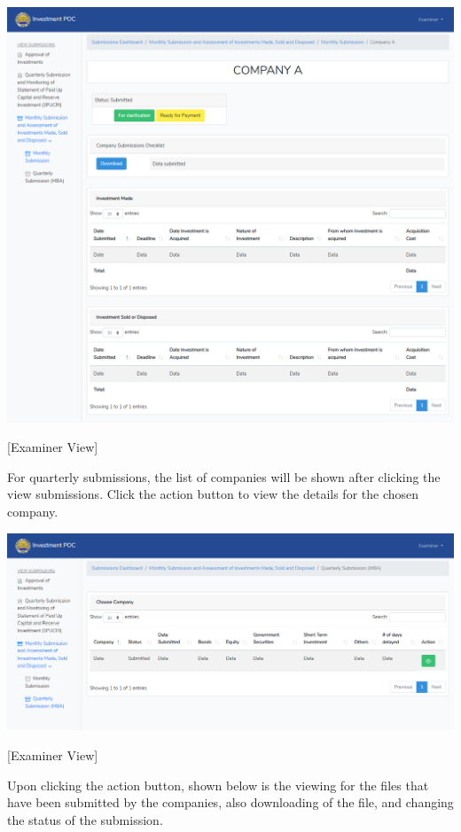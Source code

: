 \documentclass{article}
\begin{document}
\includegraphics[keepaspectratio=true]{up-ic-screens/image124}{}%

[Examiner View]%

For quarterly submissions, the list of companies will
be shown after clicking the view submissions. Click the action button to
view the details for the chosen company.%

\includegraphics[keepaspectratio=true]{up-ic-screens/image102}{}%

[Examiner View]%

Upon clicking the action button, shown below is the
viewing for the files that have been submitted by the companies, also
downloading of the file, and changing the status of the
submission.%
\end{document}
